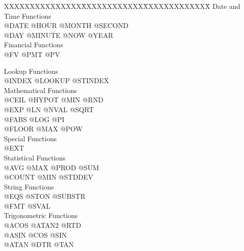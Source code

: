\begin{tabbing}
XXXXXXXXXXXXXXX\=XXXXXXXXXXXX\=XXXXXXXXXXXXX\= \kill
Date and Time Functions\\
@DATE             \>@HOUR             \>@MONTH            \>@SECOND\\
@DAY              \>@MINUTE           \>@NOW              \>@YEAR\\
\vspace{0.1in}
Financial Functions\\
@FV              \>@PMT              \>@PV\\
\vspace{0.1in}

Lookup Functions\\
  @INDEX          \>@LOOKUP           \>@STINDEX\\

\vspace{0.1in}
Mathematical Functions\\
  @CEIL           \>@HYPOT            \>@MIN              \>@RND\\
  @EXP            \>@LN              \> @NVAL             \>@SQRT\\
  @FABS           \>@LOG             \> @PI\\
  @FLOOR          \>@MAX             \> @POW\\

\vspace{0.1in}
Special Functions\\
 @EXT\\

\vspace{0.1in}
Statistical Functions\\
  @AVG           \> @MAX             \> @PROD             \>@SUM\\
  @COUNT         \> @MIN             \> @STDDEV\\

\vspace{0.1in}
String Functions\\
  @EQS            \>@STON             \>@SUBSTR\\
  @FMT            \>@SVAL\\

\vspace{0.1in}
Trigonometric Functions\\
  @ACOS           \>@ATAN2            \>@RTD\\
  @ASIN           \>@COS              \>@SIN\\
  @ATAN           \>@DTR              \>@TAN\\
\end{tabbing}

